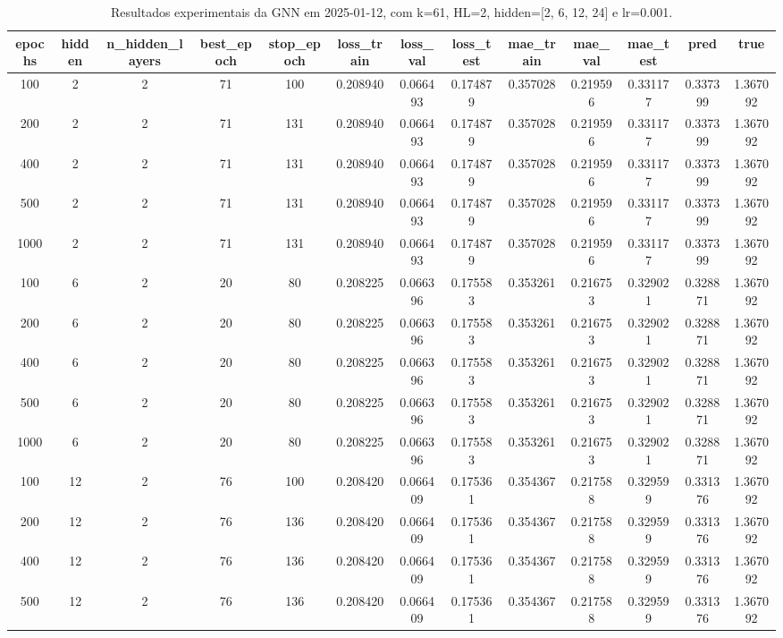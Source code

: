 \begin{table}[h]
\centering
\caption{Resultados experimentais da GNN em 2025-01-12, com k=61, HL=2, hidden=[2, 6, 12, 24] e lr=0.001.}
\label{tab:gnn_results_k61_hl2_d20250112}
\begin{tabular}{ccccccccccccc}
\toprule
epochs & hidden & n\_hidden\_layers & best\_epoch & stop\_epoch & loss\_train & loss\_val & loss\_test & mae\_train & mae\_val & mae\_test & pred & true \\
\midrule
100 & 2 & 2 & 71 & 100 & 0.208940 & 0.066493 & 0.174879 & 0.357028 & 0.219596 & 0.331177 & 0.337399 & 1.367092 \\
200 & 2 & 2 & 71 & 131 & 0.208940 & 0.066493 & 0.174879 & 0.357028 & 0.219596 & 0.331177 & 0.337399 & 1.367092 \\
400 & 2 & 2 & 71 & 131 & 0.208940 & 0.066493 & 0.174879 & 0.357028 & 0.219596 & 0.331177 & 0.337399 & 1.367092 \\
500 & 2 & 2 & 71 & 131 & 0.208940 & 0.066493 & 0.174879 & 0.357028 & 0.219596 & 0.331177 & 0.337399 & 1.367092 \\
1000 & 2 & 2 & 71 & 131 & 0.208940 & 0.066493 & 0.174879 & 0.357028 & 0.219596 & 0.331177 & 0.337399 & 1.367092 \\
100 & 6 & 2 & 20 & 80 & 0.208225 & 0.066396 & 0.175583 & 0.353261 & 0.216753 & 0.329021 & 0.328871 & 1.367092 \\
200 & 6 & 2 & 20 & 80 & 0.208225 & 0.066396 & 0.175583 & 0.353261 & 0.216753 & 0.329021 & 0.328871 & 1.367092 \\
400 & 6 & 2 & 20 & 80 & 0.208225 & 0.066396 & 0.175583 & 0.353261 & 0.216753 & 0.329021 & 0.328871 & 1.367092 \\
500 & 6 & 2 & 20 & 80 & 0.208225 & 0.066396 & 0.175583 & 0.353261 & 0.216753 & 0.329021 & 0.328871 & 1.367092 \\
1000 & 6 & 2 & 20 & 80 & 0.208225 & 0.066396 & 0.175583 & 0.353261 & 0.216753 & 0.329021 & 0.328871 & 1.367092 \\
100 & 12 & 2 & 76 & 100 & 0.208420 & 0.066409 & 0.175361 & 0.354367 & 0.217588 & 0.329599 & 0.331376 & 1.367092 \\
200 & 12 & 2 & 76 & 136 & 0.208420 & 0.066409 & 0.175361 & 0.354367 & 0.217588 & 0.329599 & 0.331376 & 1.367092 \\
400 & 12 & 2 & 76 & 136 & 0.208420 & 0.066409 & 0.175361 & 0.354367 & 0.217588 & 0.329599 & 0.331376 & 1.367092 \\
500 & 12 & 2 & 76 & 136 & 0.208420 & 0.066409 & 0.175361 & 0.354367 & 0.217588 & 0.329599 & 0.331376 & 1.367092 \\

\end{tabular}
\end{table}
